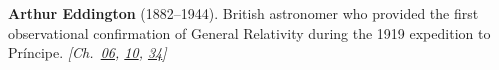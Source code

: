 \textbf{Arthur Eddington} (1882–1944). British astronomer who provided the first observational confirmation of General Relativity during the 1919 expedition to Pr\'{i}ncipe. \emph{[Ch.~\hyperref[ch:gravitytimedilation]{06}, \hyperref[ch:solarfusionquantumtunneling]{10}, \hyperref[ch:boltzmannbrain]{34}]}

